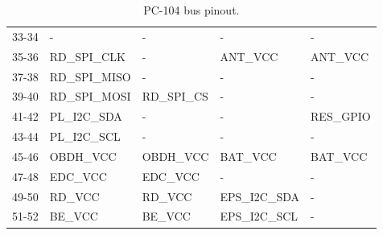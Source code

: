 \begin{table}[!h]
\begin{tabular}{cllll}
        33-34              & -                & -                & -               & -                \\
        35-36              & RD\_SPI\_CLK     & -                & ANT\_VCC        & ANT\_VCC         \\
        37-38              & RD\_SPI\_MISO    & -                & -               & -                \\
        39-40              & RD\_SPI\_MOSI    & RD\_SPI\_CS      & -               & -                \\
        41-42              & PL\_I2C\_SDA     & -                & -               & RES\_GPIO      \\
        43-44              & PL\_I2C\_SCL     & -                & -               & -                \\
        45-46              & OBDH\_VCC        & OBDH\_VCC        & BAT\_VCC        & BAT\_VCC         \\
        47-48              & EDC\_VCC         & EDC\_VCC         & -               & -                \\
        49-50              & RD\_VCC          & RD\_VCC          & EPS\_I2C\_SDA   & -                \\
        51-52              & BE\_VCC          & BE\_VCC          & EPS\_I2C\_SCL   & -                \\
        \bottomrule[1.5pt]
    \end{tabular}
    \caption{PC-104 bus pinout.}
    \label{tab:pc104-pinout}
\end{table}

